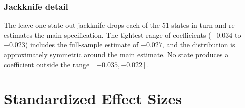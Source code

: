 \documentclass[12pt]{article}
\begin{document}
\subsubsection*{Jackknife detail} The leave-one-state-out jackknife drops each of the 51 states in turn and re-estimates the main specification. The tightest range of coefficients ($-0.034$ to $-0.023$) includes the full-sample estimate of $-0.027$, and the distribution is approximately symmetric around the main estimate. No state produces a coefficient outside the range $[-0.035, -0.022]$.

\section{Standardized Effect Sizes}
\label{sec:sde}


\end{document}
